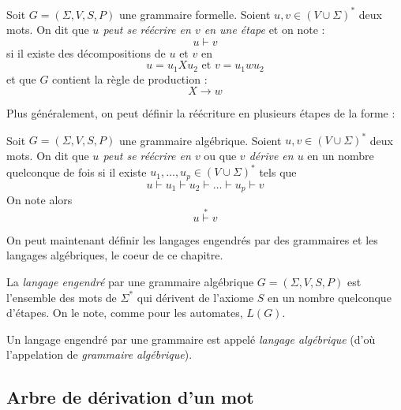 \begin{definition}
    Soit $ G = (\Sigma, V, S, P)$ une grammaire formelle. Soient $u,v \in \left( V \cup \Sigma \right)^*$ deux mots. 
    On dit que \emph{$u$ peut se réécrire en $v$ en une étape} et on note :
        \[ u \vdash v \] 
    si il existe des décompositions de $u$ et $v$ en 
        \[ u = u_1 X u_2 \text{ et } v = u_1 w u_2 \] 
    et que $G$ contient la règle de production :
        \[ X \longrightarrow w \] 
\end{definition}

Plus généralement, on peut définir la réécriture en plusieurs étapes de la forme : 

\begin{definition}[Réécriture (2)]
    Soit $ G = (\Sigma, V, S, P)$ une grammaire algébrique. Soient $u,v \in \left( V \cup \Sigma \right)^*$ deux mots.
    On dit que \emph{$u$ peut se réécrire en $v$} ou que \emph{$v$ dérive en $u$} en un nombre quelconque de fois si 
    il existe $u_1, \dots, u_p \in \left( V \cup \Sigma \right)^*$ tels que 
        \[ u \vdash u_1 \vdash u_2 \vdash \dots \vdash u_p \vdash v \] 
    On note alors 
        \[ u \overset{*}{\vdash} v \] 
\end{definition}

On peut maintenant définir les langages engendrés par des grammaires et les langages algébriques, le coeur de ce 
chapitre. 

\begin{definition}
    La \emph{langage engendré} par une grammaire algébrique $ G = (\Sigma, V, S, P)$ est l'ensemble des mots de $\Sigma^*$ 
    qui dérivent de l'axiome $S$ en un nombre quelconque d'étapes. On le note, comme pour les automates, $L(G)$. 
\end{definition}

\begin{definition}
    Un langage engendré par une grammaire est appelé \emph{langage algébrique}
    (d'où l'appelation de \emph{grammaire algébrique}).
\end{definition}


\subsection{Arbre de dérivation d'un mot}

